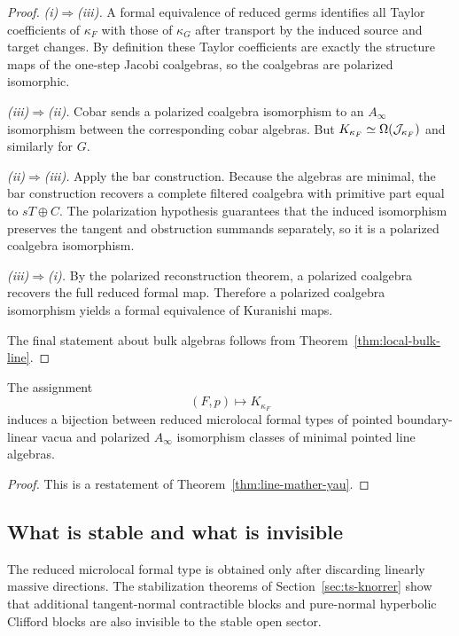 \begin{proof}
\emph{(i)$\Rightarrow$(iii).}
A formal equivalence of reduced germs identifies all Taylor coefficients of $\kappa_F$ with those of $\kappa_G$ after transport by the induced source and target changes. By definition these Taylor coefficients are exactly the structure maps of the one-step Jacobi coalgebras, so the coalgebras are polarized isomorphic.

\emph{(iii)$\Rightarrow$(ii).}
Cobar sends a polarized coalgebra isomorphism to an $A_\infty$ isomorphism between the corresponding cobar algebras. But $K_{\kappa_F}\simeq \operatorname{\Omega}(\mathcal J_{\kappa_F})$ and similarly for $G$.

\emph{(ii)$\Rightarrow$(iii).}
Apply the bar construction. Because the algebras are minimal, the bar construction recovers a complete filtered coalgebra with primitive part equal to $sT\oplus C$. The polarization hypothesis guarantees that the induced isomorphism preserves the tangent and obstruction summands separately, so it is a polarized coalgebra isomorphism.

\emph{(iii)$\Rightarrow$(i).}
By the polarized reconstruction theorem, a polarized coalgebra recovers the full reduced formal map. Therefore a polarized coalgebra isomorphism yields a formal equivalence of Kuranishi maps.

The final statement about bulk algebras follows from Theorem~\ref{thm:local-bulk-line}.
\end{proof}

\begin{corollary}%
The assignment
\[
(F,p)\longmapsto K_{\kappa_F}
\]
induces a bijection between reduced microlocal formal types of pointed boundary-linear vacua and polarized $A_\infty$ isomorphism classes of minimal pointed line algebras.
\end{corollary}

\begin{proof}
This is a restatement of Theorem~\ref{thm:line-mather-yau}.
\end{proof}

\subsection{What is stable and what is invisible}

The reduced microlocal formal type is obtained only after discarding linearly massive directions. The stabilization theorems of Section~\ref{sec:ts-knorrer} show that additional tangent-normal contractible blocks and pure-normal hyperbolic Clifford blocks are also invisible to the stable open sector.

